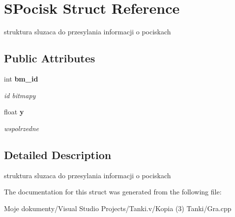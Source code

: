 \section{SPocisk Struct Reference}
\label{struct_s_pocisk}
struktura sluzaca do przesylania informacji o pociskach  


\subsection*{Public Attributes}
\begin{CompactItemize}
\item 
int {\bf bm\_\-id}\label{struct_s_pocisk_78d42b81c730283c119e40bf27211c9d}

\begin{CompactList}\small\item\em id bitmapy \item\end{CompactList}\item 
float {\bf y}\label{struct_s_pocisk_67f8fe9ab90d7a06431f77c1377b3d47}

\begin{CompactList}\small\item\em wspolrzedne \item\end{CompactList}\end{CompactItemize}


\subsection{Detailed Description}
struktura sluzaca do przesylania informacji o pociskach 



The documentation for this struct was generated from the following file:\begin{CompactItemize}
\item 
Moje dokumenty/Visual Studio Projects/Tanki.v/Kopia (3) Tanki/Gra.cpp\end{CompactItemize}
